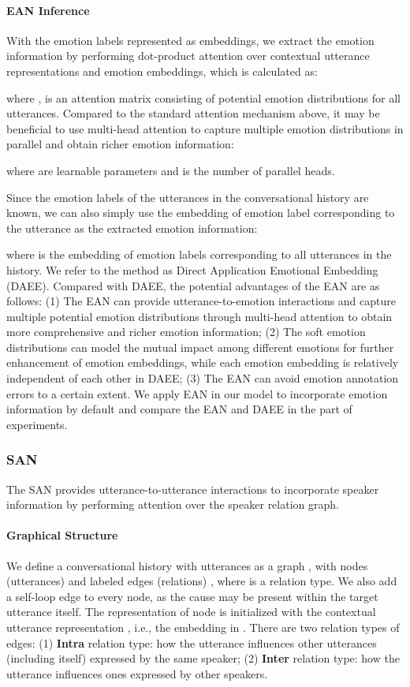 \documentclass[11pt]{article}
\begin{document}
\paragraph{EAN Inference} With the emotion labels represented as embeddings, we extract the emotion information  by performing dot-product attention over contextual utterance representations and emotion embeddings, which is calculated as:

where ,  is an attention matrix consisting of potential emotion distributions for all utterances. Compared to the standard attention mechanism above, it may be beneficial to use multi-head attention \citep{vaswani2017attention} to capture multiple emotion distributions in parallel and obtain richer emotion information:

where  are learnable parameters and  is the number of parallel heads.

Since the emotion labels of the utterances in the conversational history are known, we can also simply use the embedding of emotion label corresponding to the utterance as the extracted emotion information:

where  is the embedding of emotion labels corresponding to all utterances in the history. We refer to the method as Direct Application Emotional Embedding (DAEE). Compared with DAEE, the potential advantages of the EAN are as follows: (1) The EAN can provide utterance-to-emotion interactions and capture multiple potential emotion distributions through multi-head attention to obtain more comprehensive and richer emotion information; (2) The soft emotion distributions can model the mutual impact among different emotions for further enhancement of emotion embeddings, while each emotion embedding is relatively independent of each other in DAEE; (3) The EAN can avoid emotion annotation errors to a certain extent. We apply EAN in our model to incorporate emotion information by default and compare the EAN and DAEE in the part of experiments.

\subsubsection{SAN}
The SAN provides utterance-to-utterance interactions to incorporate speaker information by performing attention over the speaker relation graph.


\paragraph{Graphical Structure} We define a conversational history with  utterances as a graph , with nodes (utterances)  and labeled edges (relations) , where  is a relation type. We also add a self-loop edge to every node, as the cause may be present within the target utterance itself. The representation of node  is initialized with the contextual utterance representation , i.e., the  embedding in . There are two relation types of edges: (1) \textbf{Intra} relation type: how the utterance influences other utterances (including itself) expressed by the same speaker; (2) \textbf{Inter} relation type: how the utterance influences ones expressed by other speakers. 
\end{document}
